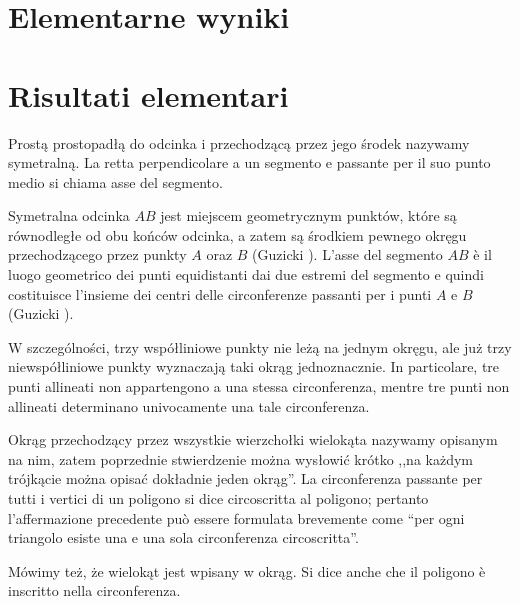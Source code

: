 
%

\section{Elementarne wyniki} %
\section{Risultati elementari} %

\begin{definition}
[symetralna] %
[asse del segmento] %
    \label{def_symetralna}
	Prostą prostopadłą do odcinka i przechodzącą przez jego środek nazywamy symetralną. %
	La retta perpendicolare a un segmento e passante per il suo punto medio si chiama asse del segmento. %
\end{definition}

Symetralna odcinka $AB$ jest miejscem geometrycznym punktów, które są równodległe od obu końców odcinka, a zatem są środkiem pewnego okręgu przechodzącego przez punkty $A$ oraz $B$ (Guzicki \cite[s. 14, 15]{guzicki_2021}). %
L'asse del segmento $AB$ è il luogo geometrico dei punti equidistanti dai due estremi del segmento e quindi costituisce l'insieme dei centri delle circonferenze passanti per i punti $A$ e $B$ (Guzicki \cite[s. 14, 15]{guzicki_2021}). %

W szczególności, trzy współliniowe punkty nie leżą na jednym okręgu, ale już trzy niewspółliniowe punkty wyznaczają taki okrąg jednoznacznie. %
In particolare, tre punti allineati non appartengono a una stessa circonferenza, mentre tre punti non allineati determinano univocamente una tale circonferenza. %


Okrąg przechodzący przez wszystkie wierzchołki wielokąta nazywamy opisanym na nim, zatem poprzednie stwierdzenie można wysłowić krótko ,,na każdym trójkącie można opisać dokładnie jeden okrąg''. %
La circonferenza passante per tutti i vertici di un poligono si dice circoscritta al poligono; pertanto l'affermazione precedente può essere formulata brevemente come ``per ogni triangolo esiste una e una sola circonferenza circoscritta''. %

Mówimy też, że wielokąt jest wpisany w okrąg. %
Si dice anche che il poligono è inscritto nella circonferenza. %

